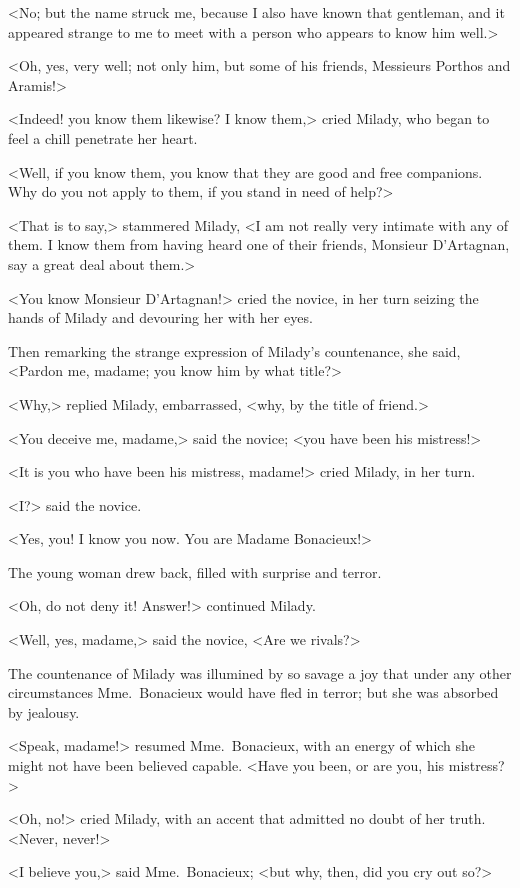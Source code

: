 <No; but the name struck me, because I also have known that gentleman, and it appeared strange to me to meet with a person who appears to know him well.> 

<Oh, yes, very well; not only him, but some of his friends, Messieurs Porthos and Aramis!> 

<Indeed! you know them likewise? I know them,> cried Milady, who began to feel a chill penetrate her heart. 

<Well, if you know them, you know that they are good and free companions. Why do you not apply to them, if you stand in need of help?> 

<That is to say,> stammered Milady, <I am not really very intimate with any of them. I know them from having heard one of their friends, Monsieur D'Artagnan, say a great deal about them.> 

<You know Monsieur D'Artagnan!> cried the novice, in her turn seizing the hands of Milady and devouring her with her eyes. 

Then remarking the strange expression of Milady's countenance, she said, <Pardon me, madame; you know him by what title?> 

<Why,> replied Milady, embarrassed, <why, by the title of friend.> 

<You deceive me, madame,> said the novice; <you have been his mistress!> 

<It is you who have been his mistress, madame!> cried Milady, in her turn. 

<I?> said the novice. 

<Yes, you! I know you now. You are Madame Bonacieux!> 

The young woman drew back, filled with surprise and terror. 

<Oh, do not deny it! Answer!> continued Milady. 

<Well, yes, madame,> said the novice, <Are we rivals?> 

The countenance of Milady was illumined by so savage a joy that under any other circumstances Mme.~Bonacieux would have fled in terror; but she was absorbed by jealousy. 

<Speak, madame!> resumed Mme.~Bonacieux, with an energy of which she might not have been believed capable. <Have you been, or are you, his mistress?> 

<Oh, no!> cried Milady, with an accent that admitted no doubt of her truth. <Never, never!> 

<I believe you,> said Mme.~Bonacieux; <but why, then, did you cry out so?> 

